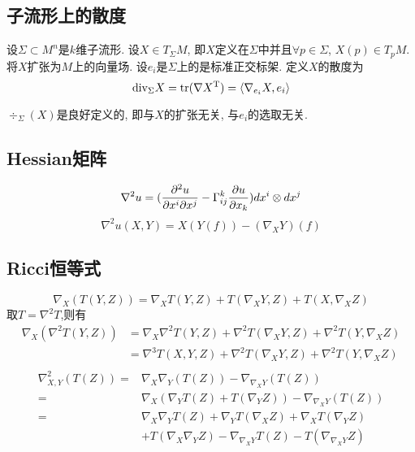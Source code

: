 \subsection{子流形上的散度}
设$\Sigma \subset M^n$是$k$维子流形. 设$X \in T_\Sigma M$, 即$X$定义在$\Sigma$中并且$\forall p \in \Sigma$, $X(p) \in T_pM$. 将$X$扩张为$M$上的向量场.  设$e_i$是$\Sigma$上的是标准正交标架. 定义$X$的散度为
\begin{equation}
    \div_\Sigma X=\tr(\nabla X^\tangent)=\inner{\nabla_{e_i}X}{e_i}
\end{equation}
\begin{proposition}
    $\div_\Sigma(X)$是良好定义的, 即与$X$的扩张无关, 与$e_i$的选取无关.
\end{proposition}
\subsection{Hessian矩阵}
\begin{equation}
    \nabla^2u=(\frac{\P^2u}{\P x^i\P x^j}-\Gamma^k_{ij}\frac{\P u}{\P x_k})dx^i\otimes dx^j
\end{equation}
\begin{equation}
    \nabla^2u(X,Y)=X(Y(f))-(\nabla_XY)(f)
\end{equation}
\subsection{Ricci恒等式}
\begin{equation}
    \nabla_X(T(Y,Z))=\nabla_XT(Y,Z)+T(\nabla_XY,Z)+T(X,\nabla_XZ)
\end{equation}
取$T=\nabla^2T$,则有
\begin{equation}
    \begin{split}
        \nabla_X(\nabla^2T(Y,Z))&=\nabla_X\nabla^2T(Y,Z)+\nabla^2T(\nabla_XY,Z)+\nabla^2T(Y,\nabla_XZ)\\
        &=\nabla^3T(X,Y,Z)+\nabla^2T(\nabla_XY,Z)+\nabla^2T(Y,\nabla_XZ)\\
    \end{split}
\end{equation}
\begin{equation}
    \begin{split}
        \nabla^2_{X,Y}(T(Z))=&\nabla_X\nabla_Y(T(Z)) -\nabla_{\nabla_XY}(T(Z))\\
        =&\nabla_X(\nabla_YT(Z)+T(\nabla_YZ)) -\nabla_{\nabla_XY}(T(Z))\\
        =&\nabla_X\nabla_YT(Z)+\nabla_YT(\nabla_XZ)+\nabla_XT(\nabla_YZ) \\
        &+T(\nabla_X\nabla_YZ)-\nabla_{\nabla_XY}T(Z)-T(\nabla_{\nabla_XY}Z)
    \end{split}
\end{equation}
